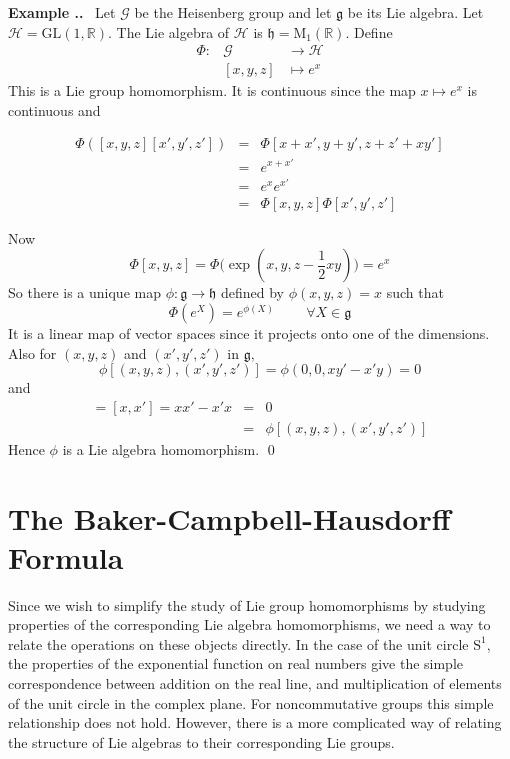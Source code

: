 \documentclass[honours]{UNSWthesis}
\newcommand{\R}{\mathbb{R}}
\newcommand{\G}{\mathcal{G}}
\newcommand{\g}{\mathfrak{g}}
\newcommand{\1}{\mathbf{e}_{1}}
\newcommand{\2}{\mathbf{e}_{3}}
\newcommand{\3}{\mathbf{e}_{3}}
\newcounter{Item}[section]
\newenvironment{Example}{\medskip
                            \refstepcounter{Item}
                            \noindent
                           {\bf Example \thesection.\theItem.}\ }
                           {\qed}
\begin{document}
\begin{Example}
Let $\G$ be the Heisenberg group and let $\g$ be its Lie algebra. Let $\mathcal{H}=\mathrm{GL}(1,\R)$. The Lie algebra of $\mathcal{H}$ is $\mathfrak{h}=\mathrm{M}_{1}(\R)$. Define 
\begin{eqnarray*}
\Phi :& \G &\longrightarrow  \mathcal{H} \\
&[x,y,z] &\longmapsto  e^{x}
\end{eqnarray*}
This is a Lie group homomorphism. It is continuous since the map $x \mapsto e^{x}$ is continuous and 

\begin{eqnarray*}
\Phi ([x,y,z][x',y',z']) &=& \Phi [x+x',y+y', z+z'+xy'] \\
&=& e^{x+x'} \\
&=& e^{x}e^{x'} \\
&=& \Phi [x,y,z] \Phi [x',y',z']
\end{eqnarray*}

Now
\[
\Phi [x,y,z] = \Phi (\exp{(x,y,z-\frac{1}{2}xy))}=e^{x}
\]
So there is a unique map $\phi: \g \longrightarrow \mathfrak{h}$ defined by $\phi(x,y,z)=x$ such that
\[
\Phi(e^{X}) = e^{\phi(X)} \;\;\;\;\;\;\;\; \forall X \in \g
\]
 It is a linear map of vector spaces since it projects onto one of the dimensions. Also for $(x,y,z)$ and $(x',y',z')$ in $\g$, 
\[ \phi [(x,y,z), (x',y',z')]=\phi (0,0,xy'-x'y)=0
\]
and
\begin{eqnarray*}
[\phi(x,y,z),\phi(x',y',z')]=[x,x']=xx'-x'x &=& 0 \\
&=&  \phi [(x,y,z), (x',y',z')]
\end{eqnarray*}
Hence $\phi$ is a Lie algebra homomorphism.
\end{Example}

\section{The Baker-Campbell-Hausdorff Formula}

Since we wish to simplify the study of Lie group homomorphisms by studying properties of the corresponding Lie algebra homomorphisms, we need a way to relate the operations on these objects directly. In the case of the unit circle $\mathrm{S}^{1}$, the properties of the exponential function on real numbers give the simple correspondence between addition on the real line, and multiplication of elements of the unit circle in the complex plane. For noncommutative groups this simple relationship does not hold. However, there is a more complicated way of relating the structure of Lie algebras to their corresponding Lie groups. 
\end{document}
